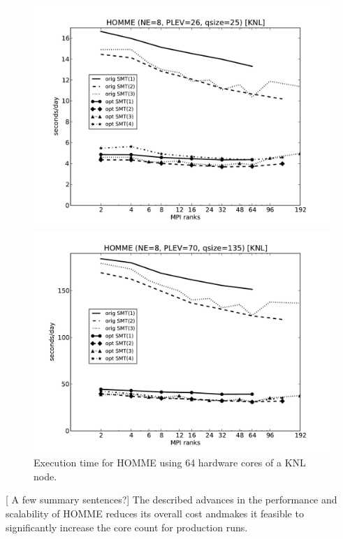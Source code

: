 \begin{figure}
\centering
\begin{minipage}{1.\textwidth}
  \centering
  \includegraphics[width=1.\linewidth,height=.44\textheight]{figures/homme-knl-ne8-cam.pdf}
 \caption{A CAM-like configuration at $ne=8$ ($plev=26$, $qsize=25$)}
  \label{fig:homme-knl-ne8-cam}
\end{minipage}
\begin{minipage}{1.\textwidth}
   \centering
   \includegraphics[width=1.\linewidth,height=.44\textheight]{figures/homme-knl-ne8-waccm.pdf}
   \caption{A WACCM-like configuration at $ne=8$ ($plev=70$, $qsize=135$)}
   \label{fig:homme-knl-ne8-waccm}
\end{minipage}
\caption{Execution time for HOMME using 64 hardware cores of a KNL node.}
\end{figure}


[{\color{red} A few summary sentences?}]
The described advances in the performance and scalability of HOMME reduces its overall cost andmakes it feasible to significantly increase the core count for production runs.